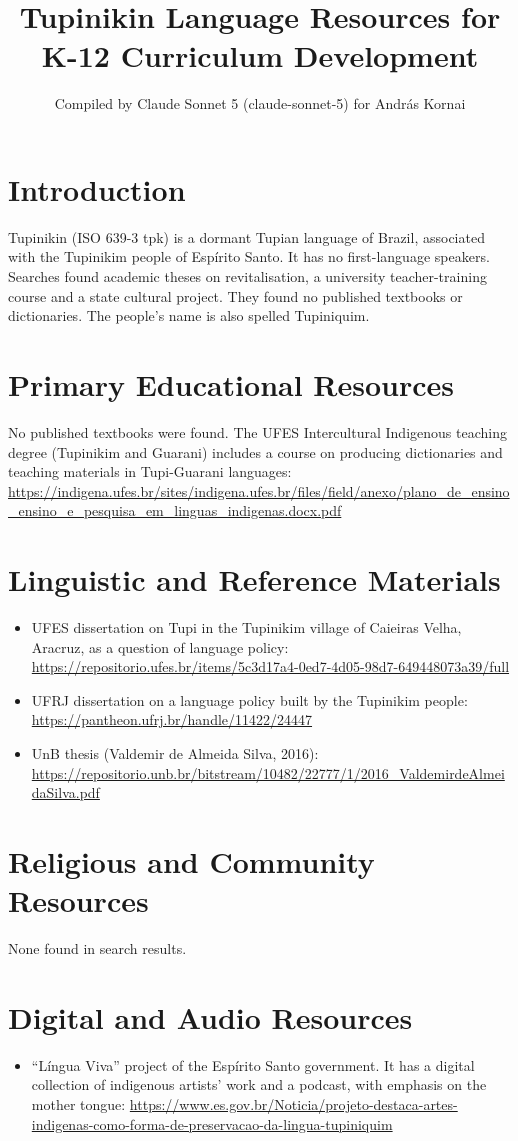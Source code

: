 \documentclass[12pt]{article}
\title{Tupinikin Language Resources for K-12 Curriculum Development}
\author{Compiled by Claude Sonnet 5 (claude-sonnet-5) for Andr\'as Kornai}
\date{}
\begin{document}
\maketitle
\section{Introduction}
Tupinikin (ISO 639-3 tpk) is a dormant Tupian language of Brazil, associated with the Tupinikim people of Esp\'irito Santo. It has no first-language speakers. Searches found academic theses on revitalisation, a university teacher-training course and a state cultural project. They found no published textbooks or dictionaries. The people's name is also spelled Tupiniquim.
\section{Primary Educational Resources}
No published textbooks were found. The UFES Intercultural Indigenous teaching degree (Tupinikim and Guarani) includes a course on producing dictionaries and teaching materials in Tupi-Guarani languages: \url{https://indigena.ufes.br/sites/indigena.ufes.br/files/field/anexo/plano_de_ensino_ensino_e_pesquisa_em_linguas_indigenas.docx.pdf}
\section{Linguistic and Reference Materials}
\begin{itemize}
\item UFES dissertation on Tupi in the Tupinikim village of Caieiras Velha, Aracruz, as a question of language policy: \url{https://repositorio.ufes.br/items/5c3d17a4-0ed7-4d05-98d7-649448073a39/full}
\item UFRJ dissertation on a language policy built by the Tupinikim people: \url{https://pantheon.ufrj.br/handle/11422/24447}
\item UnB thesis (Valdemir de Almeida Silva, 2016): \url{https://repositorio.unb.br/bitstream/10482/22777/1/2016_ValdemirdeAlmeidaSilva.pdf}
\end{itemize}
\section{Religious and Community Resources}
None found in search results.
\section{Digital and Audio Resources}
\begin{itemize}
\item ``L\'ingua Viva'' project of the Esp\'irito Santo government. It has a digital collection of indigenous artists' work and a podcast, with emphasis on the mother tongue: \url{https://www.es.gov.br/Noticia/projeto-destaca-artes-indigenas-como-forma-de-preservacao-da-lingua-tupiniquim}
\end{itemize}
\end{document}
